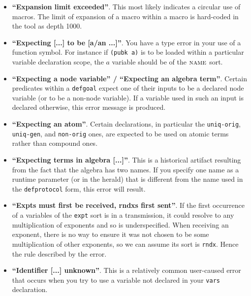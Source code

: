 \begin{itemize}
\item \textbf{``Expansion limit exceeded''}.  This most likely indicates
  a circular use of macros.  The limit of expansion of a macro within a macro is
  hard-coded in the tool as depth 1000.

\item \textbf{``Expecting [...] to be [a/an ...]''}.  You have a type
  error in your use of a function symbol.  For instance if
  \texttt{(pubk a)} is to be loaded within a particular variable
  declaration scope, the $a$ variable should be of the $\scap{name}$
  sort.

\item \textbf{``Expecting a node variable'' / ``Expecting an algebra
  term''}.  Certain predicates within a \texttt{defgoal} expect one of
  their inputs to be a declared node variable (or to be a non-node
  variable).  If a variable used in such an input is declared
  otherwise, this error message is produced.

\item \textbf{``Expecting an atom''}.  Certain declarations, in particular
  the \texttt{uniq-orig}, \texttt{uniq-gen}, and \texttt{non-orig} ones,
  are expected to be used on atomic terms rather than compound ones.

\item \textbf{``Expecting terms in algebra [...]''}. This is a
  historical artifact resulting from the fact that the algebra has two
  names. If you specify one name as a runtime parameter (or in the
  herald) that is different from the name used in the
  \texttt{defprotocol} form, this error will result.

\item \textbf{``Expts must first be received, rndxs first
    sent''}. If the first occurrence of a variables of the
  \texttt{expt} sort is in a transmission, it could resolve to any
  multiplication of exponents and so is underspecified. When receiving
  an exponent, there is no way to ensure it was not chosen to be some
  multiplication of other exponents, so we can assume its sort is
  \texttt{rndx}. Hence the rule described by the error. 
  
\item \textbf{``Identifier [...] unknown''}.  This is a relatively common
  user-caused error that occurs when you try to use a variable not declared
  in your \texttt{vars} declaration.


\end{itemize}
